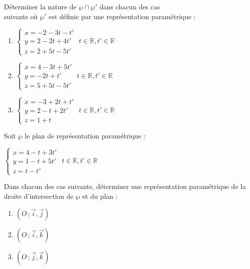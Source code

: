 \begin{colonne*exercice}
\begin{exercice}
Déterminer la nature de $\wp\cap\wp'$ dans chacun des cas\\
suivants où $\wp'$ est définie par une représentation paramétrique :
\begin{enumerate}
\item \begin{center}
    $\begin{cases}x=-2-3t-t' \\y=2-2t+4t' \\z=2+5t-5t' \end{cases}$
    $t\in\mathbb{R}, t'\in\mathbb{R}$
  \end{center}
\item \begin{center}
    $\begin{cases}x=4-3t+5t' \\y=-2t+t' \\z=5+5t-5t' \end{cases}$
    $t\in\mathbb{R}, t'\in\mathbb{R}$
  \end{center}
\item \begin{center}
    $\begin{cases}x=-3+2t+t' \\y=2-t+2t' \\z=1+t \end{cases}$
    $t\in\mathbb{R}, t'\in\mathbb{R}$
  \end{center}
\end{enumerate}
\end{exercice}

\begin{exercice}
  Soit $\wp$ le plan de représentation paramétrique :
  \begin{center}
    $\begin{cases}x=4-t+3t' \\y=1-t+5t' \\z=t-t' \end{cases}$
    $t\in\mathbb{R}, t'\in\mathbb{R}$
  \end{center}Dans chacun des cas suivants, déterminer une
  représentation paramétrique de la droite d'intersection de $\wp$ et
  du plan :
  \begin{enumerate}
  \item $(O\,;\overrightarrow{i},\overrightarrow{j})$
  \item $(O\,;\overrightarrow{i},\overrightarrow{k})$
  \item $(O\,;\overrightarrow{j},\overrightarrow{k})$
  \end{enumerate}
\end{exercice}


\end{colonne*exercice}
